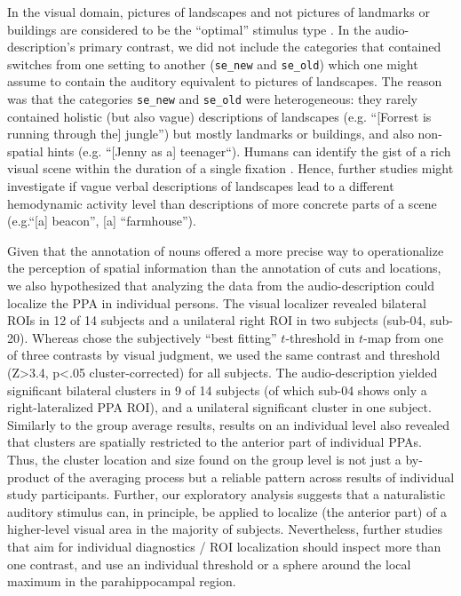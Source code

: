 \documentclass[english]{article}
\begin{document}

In the visual domain, pictures of landscapes and not pictures of landmarks or
buildings are considered to be the ``optimal'' stimulus type
\citep{epstein2008parahippocampal}.
In the audio-description's primary contrast, we did not include the categories
that contained switches from one setting to another (\texttt{se\_new} and
\texttt{se\_old}) which one might assume to contain the auditory equivalent to
pictures of landscapes.
The reason was that the categories \texttt{se\_new} and \texttt{se\_old} were
heterogeneous: they rarely contained holistic (but also vague) descriptions of
landscapes (e.g.  ``[Forrest is running through the] jungle'') but mostly
landmarks or buildings, and also non-spatial hints (e.g. ``[Jenny as a]
teenager``).
Humans can identify the gist of a rich visual scene within the duration of a
single fixation \citep{henderson2003human}.
%
Hence, further studies might investigate if vague verbal descriptions of
landscapes lead to a different hemodynamic activity level than descriptions of
more concrete parts of a scene (e.g.``[a] beacon'', [a] ``farmhouse'').


Given that the annotation of nouns offered a more precise way to operationalize
the perception of spatial information than the annotation of cuts and locations,
we also hypothesized that analyzing the data from the audio-description could
localize the PPA in individual persons.
The visual localizer \citep{sengupta2016extension} revealed bilateral ROIs in 12
of 14 subjects and a unilateral right ROI in two subjects (sub-04, sub-20).
%
Whereas \citep{sengupta2016extension} chose the subjectively ``best fitting''
$t$-threshold in $t$-map from one of three contrasts by visual judgment, we used
the same contrast and threshold (Z>3.4, p<.05 cluster-corrected) for all
subjects.
The audio-description yielded significant bilateral clusters in 9 of 14 subjects
(of which sub-04 shows only a right-lateralized PPA ROI), and a unilateral
significant cluster in one subject.
Similarly to the group average results, results on an individual level also
revealed that clusters are spatially restricted to the anterior part of
individual PPAs.
Thus, the cluster location and size found on the group level is not just a
by-product of the averaging process but a reliable pattern across results of
individual study participants.
Further, our exploratory analysis suggests that a naturalistic auditory stimulus
can, in principle, be applied to localize (the anterior part) of a higher-level
visual area in the majority of subjects.
Nevertheless, further studies that aim for individual diagnostics / ROI
localization should inspect more than one contrast, and use an individual
threshold or a sphere around the local maximum \citep{poldrack2007region} in the
parahippocampal region.
\end{document}
